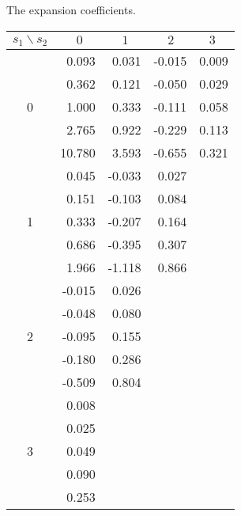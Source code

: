 \btb
\caption{The expansion coefficients.\hfill}
\begin{center}
\begin{tabular}{|c|r|r|r|r|}
\hline
$s_1\backslash s_2$ & $0\quad$ & $1\quad$ & $2\quad$ & $3\quad$ \\
\hline
&       0.093   & 0.031 & -0.015& 0.009 \\
&       0.362   & 0.121 & -0.050& 0.029 \\
0&      1.000   & 0.333 & -0.111& 0.058 \\
&       2.765   & 0.922 & -0.229& 0.113 \\
&       10.780  & 3.593 & -0.655& 0.321 \\
\hline
&       0.045   & -0.033& 0.027  \\
&       0.151   & -0.103& 0.084  \\
1&      0.333   & -0.207& 0.164  \\
&       0.686   & -0.395& 0.307  \\
&       1.966   & -1.118& 0.866  \\
\cline{1-4}
&       -0.015  & 0.026  \\
&       -0.048  & 0.080  \\
2&      -0.095  & 0.155  \\
&       -0.180  & 0.286  \\
&       -0.509  & 0.804  \\
\cline{1-3}
&       0.008    \\
&       0.025    \\
3&      0.049    \\
&       0.090    \\
&       0.253    \\
\cline{1-2}
\end{tabular}
\end{center}
\etb


